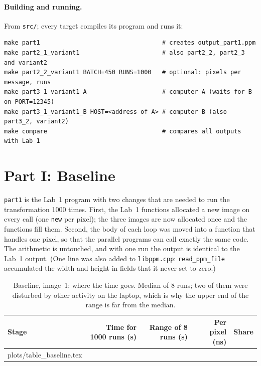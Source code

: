 \documentclass[11pt,a4paper]{article}
\makeatletter
\newcommand{\rows}[1]{\@@input plots/#1.tex }
\makeatother
\begin{document}
\paragraph{Building and running.} From \texttt{src/}; every target compiles its program and runs it:
{\small
\begin{verbatim}
make part1                                  # creates output_part1.ppm
make part2_1_variant1                       # also part2_2, part2_3 and variant2
make part2_2_variant1 BATCH=450 RUNS=1000   # optional: pixels per message, runs
make part3_1_variant1_A                     # computer A (waits for B on PORT=12345)
make part3_1_variant1_B HOST=<address of A> # computer B (also part3_2, variant2)
make compare                                # compares all outputs with Lab 1
\end{verbatim}}

\section{Part I: Baseline}

\texttt{part1} is the Lab~1 program with two changes that are needed to run the transformation 1000
times. First, the Lab~1 functions allocated a new image on every call (one \texttt{new} per pixel);
the three images are now allocated once and the functions fill them. Second, the body of each loop
was moved into a function that handles one pixel, so that the parallel programs can call exactly the
same code. The arithmetic is untouched, and with one run the output is identical to the Lab~1 output.
(One line was also added to \texttt{libppm.cpp}: \texttt{read\_ppm\_file} accumulated the width and
height in fields that it never set to zero.)

\begin{table}[H]
\centering\small
\begin{tabular}{@{}lrrrr@{}}
\toprule
Stage & Time for 1000 runs (s) & Range of 8 runs (s) & Per pixel (ns) & Share \\
\midrule
\rows{table_baseline}
\bottomrule
\end{tabular}
\caption{Baseline, image~1: where the time goes. Median of 8 runs; two of them were disturbed by
other activity on the laptop, which is why the upper end of the range is far from the median.}
\label{tab:baseline}
\end{table}
\end{document}
